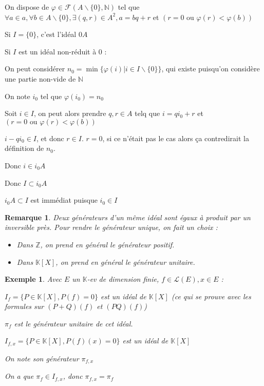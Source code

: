 \documentclass[a4paper,12pt]{book}
\newcommand{\Pre}[1]{\begin{tcolorbox}[sharp corners, colback=white,colframe=green!60!green!30!black!75, title=Preuve]#1\end{tcolorbox}}
\newtheorem{Exe}{Exemple}[section]
\newtheorem{Rem}{Remarque}[section]
\def\N{\mathbb{N}}
\def\Z{\mathbb{Z}}
\def\K{\mathbb{K}}
\begin{document}
\Pre{On dispose de $\varphi\in\mathcal{F}(A\backslash\{0\}, \N)$ tel que $\forall a\in a, \forall b\in A\backslash\{0\}, \exists (q,r)\in A^2, a=bq+r$ et $(r=0\text{ ou }\varphi(r)<\varphi(b))$
\par Si $I=\{0\}$, c'est l'idéal $0A$
\par Si $I$ est un idéal non-réduit à $0$ : \par On peut considérer $n_0=\min\{\varphi(i)\vert i\in I\backslash\{0\}\}$, qui existe puisqu'on considère une partie non-vide de $\N$ \par On note $i_0$ tel que $\varphi(i_0)=n_0$ \par Soit $i\in I$, on peut alors prendre $q,r\in A$ telq que $i =qi_0+r$ et $(r=0\text{ ou }\varphi(r)<\varphi(b))$
\par $i-qi_0\in I$, et donc $r\in I$. $r=0$, si ce n'était pas le cas alors ça contredirait la définition de $n_0$. \par Donc $i\in i_0A$ \par Donc $I\subset i_0A$  \par $i_0A\subset I$ est immédiat puisque $i_0 \in I$}
\begin{Rem}
Deux générateurs d'un même idéal sont égaux à produit par un inversible près. Pour rendre le générateur unique, on fait un choix :\begin{itemize}
\item Dans $\Z$, on prend en général le générateur positif.
\item Dans $\K[X]$, on prend en général le générateur unitaire.
\end{itemize}
\end{Rem}
\begin{Exe}
Avec $E$ un $\K$-ev de dimension finie, $f\in\mathcal{L}(E), x\in E$ :
\par $I_f =\{P\in\K[X],P(f)=0\}$ est un idéal de $\K[X]$ (ce qui se prouve avec les formules sur $(P+Q)(f)$ et $(PQ)(f)$) \par $\pi_f$ est le générateur unitaire de cet idéal.
\par $I_{f,x} = \{P\in\K[X], P(f)(x)=0\}$ est un idéal de $\K[X]$ \par On note son générateur $\pi_{f,x}$ \par On a que $\pi_f\in I_{f,x}$, donc $\pi_{f,x}=\pi_f$ 
\end{Exe}
\end{document}
